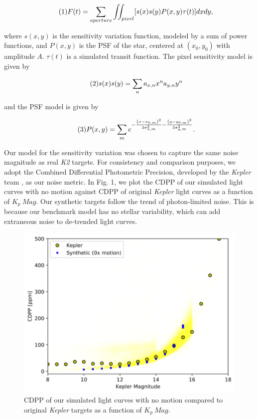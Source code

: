 \documentclass[12pt,preprint]{emulateapj}
\begin{document}
\[
\tag{1}
F(t)=\sum_{aperture} \iint_{pixel} [s(x)s(y)P(x,y)\tau (t)]dxdy,\\
\]

where $s(x,y)$ is the sensitivity variation function, modeled by a sum of power functions, and $P(x,y)$ is the PSF of the star, centered at $(x_0,y_0)$ with amplitude $A$. $\tau (t)$ is a simulated transit function. The pixel sensitivity model is given by

\[
\tag{2}
s(x)s(y) = \sum_n a_{x,n}x^na_{y,n}y^n \\
\]

and the PSF model is given by

\[
\tag{3}
P(x,y) = \sum_m e^{-\frac{\left(x-x_{0,m} \right)^2}{2\sigma_{x,m}^2}-\frac{\left(y-y_{0,m} \right)^2}{2\sigma_{y,m}^2}}. \\
\]

Our model for the sensitivity variation was chosen to capture the same noise magnitude as real \textit{K2} targets. For consistency and comparison purposes, we adopt the Combined Differential Photometric Precision, developed by the \textit{Kepler} team \citep{2012PASP..124.1279C}, as our noise metric. In Fig. 1, we plot the CDPP of our simulated light curves with no motion against CDPP of original \textit{Kepler} light curves as a function of $K_p\ Mag$. Our synthetic targets follow the trend of photon-limited noise. This is because our benchmark model has no stellar variability, which can add extraneous noise to de-trended light curves.

\begin{figure}[h]
	\centering
	\includegraphics[width=1.0\linewidth]{nomotion.png}
	\caption{CDPP of our simulated light curves with no motion compared to original \textit{Kepler} targets as a function of $K_p\ Mag$.}
	\label{fig:nomotion}
\end{figure}
\end{document}
